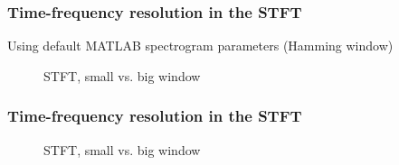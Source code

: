 \documentclass{beamer}
\begin{document}
\begin{frame}
	\frametitle{Time-frequency resolution in the STFT}
	Using default MATLAB spectrogram parameters (Hamming window)
	\begin{figure}
		\vspace{-1em}
		\centering
		\caption{STFT, small vs. big window}
	\end{figure}
\end{frame}

\begin{frame}
	\frametitle{Time-frequency resolution in the STFT}
	\begin{figure}
		\centering
		\caption{STFT, small vs. big window}
	\end{figure}
\end{frame}
\end{document}
